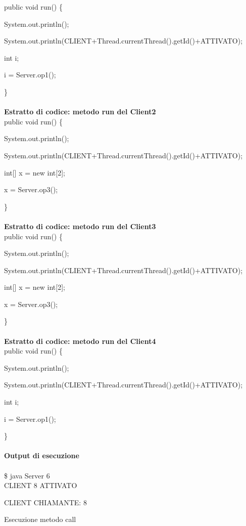 \documentclass[10pt, a4paper]{article}
\begin{document}
public void run() \{

		System.out.println();

        	System.out.println(CLIENT+Thread.currentThread().getId()+ATTIVATO);

		int i;

		i = Server.op1();

\}
\\\\
\textbf{Estratto di codice: metodo run del Client2}
\\

public void run() \{

		System.out.println();

        	System.out.println(CLIENT+Thread.currentThread().getId()+ATTIVATO);

		int[] x = new int[2];

		x = Server.op3();

\}
\\\\
\textbf{Estratto di codice: metodo run del Client3}
\\

public void run() \{

		System.out.println();

        	System.out.println(CLIENT+Thread.currentThread().getId()+ATTIVATO);

		int[] x = new int[2];

		x = Server.op3();

\}
\\\\
\textbf{Estratto di codice: metodo run del Client4}
\\

public void run() \{

		System.out.println();

        	System.out.println(CLIENT+Thread.currentThread().getId()+ATTIVATO);

		int i;

		i = Server.op1();

\}
\\\\
\textbf{Output di esecuzione}
\\\\
\$ java Server 6
\\

CLIENT 8 ATTIVATO

CLIENT CHIAMANTE: 8

Esecuzione metodo call
\end{document}
